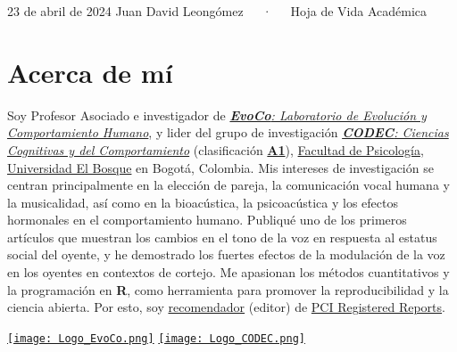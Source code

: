 \documentclass[11pt,a4paper,]{awesome-cv}
\begin{document}
\makecvheader

\makecvfooter
  {23 de abril de 2024}
    {Juan David Leongómez~~~·~~~Hoja de Vida Académica}
  {\thepage}





\hypertarget{acerca-de-muxed}{%
\section{Acerca de mí}\label{acerca-de-muxed}}

\begin{minipage}[c]{0.85\linewidth}
Soy Profesor Asociado e investigador de \href{https://jdleongomez.info/es/team/}{\textit{\textbf{EvoCo}: Laboratorio de Evolución y Comportamiento Humano}}, y lider del grupo de investigación \href{https://investigaciones.unbosque.edu.co/codec}{\textit{\textbf{CODEC}: Ciencias Cognitivas y del Comportamiento}} (clasificación  \href{https://scienti.minciencias.gov.co/gruplac/jsp/visualiza/visualizagr.jsp?nro=00000000001446}{\textbf{A1}}),  \href{https://www.uelbosque.edu.co/psicologia}{Facultad de Psicología}, \href{https://www.uelbosque.edu.co/}{Universidad El Bosque} en Bogotá, Colombia. Mis intereses de investigación se centran principalmente en la elección de pareja, la comunicación vocal humana y la musicalidad, así como en la bioacústica, la psicoacústica y los efectos hormonales en el comportamiento humano. Publiqué uno de los primeros artículos que muestran los cambios en el tono de la voz en respuesta al estatus social del oyente, y he demostrado los fuertes efectos de la modulación de la voz en los oyentes en contextos de cortejo. Me apasionan los métodos cuantitativos y la programación en \textbf{R}, como herramienta para promover la reproducibilidad y la ciencia abierta. Por esto, soy \href{https://rr.peercommunityin.org/about/recommenders}{recomendador} (editor) de \href{https://rr.peercommunityin.org/}{PCI Registered Reports}.
\end{minipage} \begin{minipage}[c]{0.15\linewidth}
\begin{flushright} 
\hfill \href{https://jdleongomez.info/es/team/}{\texttt{[image: Logo\_EvoCo.png]}} \newline \href{https://investigaciones.unbosque.edu.co/codec}{\texttt{[image: Logo\_CODEC.png]}}
\end{flushright}
\end{minipage}
\end{document}
